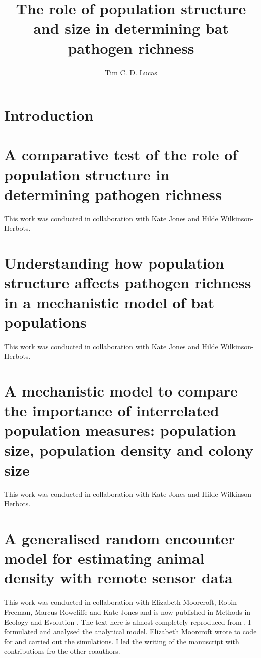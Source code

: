 \documentclass[11pt,phd,a4paper,oneside]{stanley}
\title{The role of population structure and size in determining bat pathogen richness}
\author{Tim C. D. Lucas}
\begin{document}
\frontmatter



\mainmatter

\chapter{Introduction}
\label{ch:intro}


\chapter{A comparative test of the role of population structure in determining pathogen richness}{This work was conducted in collaboration with Kate Jones and Hilde Wilkinson-Herbots.}


\label{ch:empirical}


\chapter{Understanding how population structure affects pathogen richness in a mechanistic model of bat populations}{This work was conducted in collaboration with Kate Jones and Hilde Wilkinson-Herbots.}
\label{ch:sims1}


\chapter{A mechanistic model to compare the importance of interrelated population measures: population size, population density and colony size}{This work was conducted in collaboration with Kate Jones and Hilde Wilkinson-Herbots.}
\label{ch:sims2}



\chapter{A generalised random encounter model for estimating animal density with remote sensor data}{
This work was conducted in collaboration with Elizabeth Moorcroft, Robin Freeman, Marcus Rowcliffe and Kate Jones and is now published in Methods in Ecology and Evolution \cite{lucas2015generalised}.
The text here is almost completely reproduced from \textcite{lucas2015generalised}.
I formulated and analysed the analytical model.
Elizabeth Moorcroft wrote to code for and carried out the simulations.
I led the writing of the manuscript with contributions fro the other coauthors.
}
\label{ch:grem}

\end{document}
